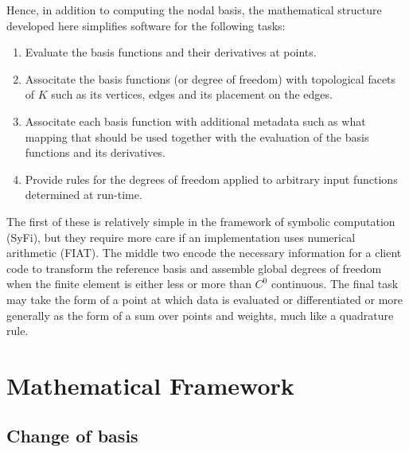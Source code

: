 Hence, in addition to computing the nodal basis, the mathematical structure developed here
simplifies software for the following tasks:

\begin{enumerate}
\item Evaluate the basis functions and their derivatives at points.
\item Associtate the basis functions (or degree of freedom) with
      topological facets of \( K \) such as its vertices, edges and its
      placement on the edges.
\item Associtate each basis function with additional metadata such
      as  what mapping that should be used together with
      the evaluation of the basis functions and its derivatives.
\item Provide rules for the degrees of freedom applied to arbitrary input
      functions determined at run-time.
\end{enumerate}


The first of these is relatively simple in the framework
of symbolic computation (SyFi), but they require more care if an
implementation uses numerical arithmetic (FIAT).  The middle two
encode the necessary information for a client code to transform the
reference basis and assemble global degrees of freedom when the
finite element is either less or more than $C^0$ continuous. The final
task may take the form of a point at which data is evaluated or
differentiated or more generally as the form of a sum over points and
weights,  much like a quadrature rule.


\section{Mathematical Framework}
\subsection{Change of basis}


